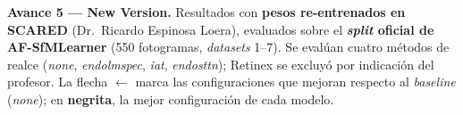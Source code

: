 \documentclass{article}
\begin{document}
\begin{table}[htbp]
\centering
\small
\setlength{\tabcolsep}{5pt}
\renewcommand{\arraystretch}{1.15}

\caption{\textbf{Avance 5 — New Version.} Resultados con \textbf{pesos re-entrenados en SCARED} (Dr.\ Ricardo Espinosa Loera), evaluados sobre el \textbf{\textit{split} oficial de AF-SfMLearner} (550 fotogramas, \textit{datasets} 1--7). Se evalúan cuatro métodos de realce (\textit{none}, \textit{endolmspec}, \textit{iat}, \textit{endosttn}); Retinex se excluyó por indicación del profesor. La flecha $\leftarrow$ marca las configuraciones que mejoran respecto al \textit{baseline} (\textit{none}); en \textbf{negrita}, la mejor configuración de cada modelo.}
\label{tab:avance5_newversion}


\end{table}
\end{document}
